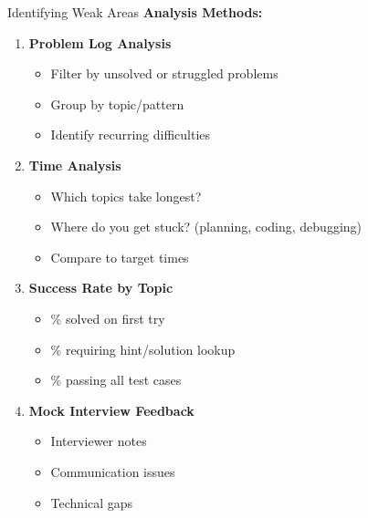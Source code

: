 \documentclass[aspectratio=169,xcolor=dvipsnames]{beamer}
\begin{document}
\begin{frame}{Identifying Weak Areas}
  \textbf{Analysis Methods:}

  \vspace{0.3cm}
  \begin{enumerate}
    \item \textbf{Problem Log Analysis}
    \begin{itemize}
      \item Filter by unsolved or struggled problems
      \item Group by topic/pattern
      \item Identify recurring difficulties
    \end{itemize}

    \vspace{0.2cm}
    \item \textbf{Time Analysis}
    \begin{itemize}
      \item Which topics take longest?
      \item Where do you get stuck? (planning, coding, debugging)
      \item Compare to target times
    \end{itemize}

    \vspace{0.2cm}
    \item \textbf{Success Rate by Topic}
    \begin{itemize}
      \item \% solved on first try
      \item \% requiring hint/solution lookup
      \item \% passing all test cases
    \end{itemize}

    \vspace{0.2cm}
    \item \textbf{Mock Interview Feedback}
    \begin{itemize}
      \item Interviewer notes
      \item Communication issues
      \item Technical gaps
    \end{itemize}
  \end{enumerate}
\end{frame}
\end{document}
